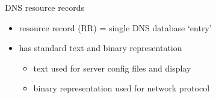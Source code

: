 \usetikzlibrary{decorations.pathreplacing,decorations.pathmorphing,arrows.meta}

\begin{frame}{DNS resource records}
\begin{itemize}
\item resource record (RR) = single DNS database `entry'
\item has standard text and binary representation
    \begin{itemize}
    \item text used for server config files and display
    \item binary representation used for network protocol
    \end{itemize}
\end{itemize}
\end{frame}

